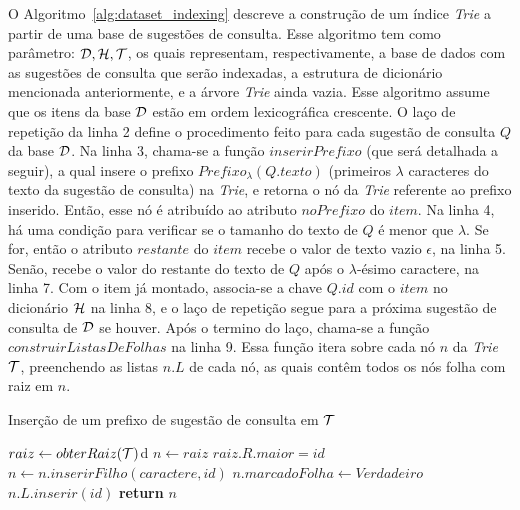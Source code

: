 O Algoritmo~\ref{alg:dataset_indexing} descreve a construção de um índice \textit{Trie} a partir de uma base de sugestões de consulta. Esse algoritmo tem como parâmetro: $\mathcal{D}, \mathcal{H}, \mathcal{T}$, os quais representam, respectivamente, a base de dados com as sugestões de consulta que serão indexadas, a estrutura de dicionário mencionada anteriormente, e a árvore \textit{Trie} ainda vazia. Esse algoritmo assume que os itens da base $\mathcal{D}$ estão em ordem lexicográfica crescente. O laço de repetição da linha 2 define o procedimento feito para cada sugestão de consulta $Q$ da base $\mathcal{D}$. Na linha 3, chama-se a função $inserirPrefixo$ (que será detalhada a seguir), a qual insere o prefixo $Prefixo_{\lambda}(Q.texto)$ (primeiros $\lambda$ caracteres do texto da sugestão de consulta) na \textit{Trie}, e retorna o nó da \textit{Trie} referente ao prefixo inserido. Então, esse nó é atribuído ao atributo $noPrefixo$ do $item$. Na linha 4, há uma condição para verificar se o tamanho do texto de $Q$ é menor que $\lambda$. Se for, então o atributo $restante$ do $item$ recebe o valor de texto vazio $\epsilon$, na linha 5. Senão, recebe o valor do restante do texto de $Q$ após o $\lambda$-ésimo caractere, na linha 7. Com o item já montado, associa-se a chave $Q.id$ com o $item$ no dicionário $\mathcal{H}$ na linha 8, e o laço de repetição segue para a próxima sugestão de consulta de $\mathcal{D}$ se houver. Após o termino do laço, chama-se a função $construirListasDeFolhas$ na linha 9. Essa função itera sobre cada nó $n$ da \textit{Trie}  $\mathcal{T}$, preenchendo as listas $n.L$ de cada nó, as quais contêm todos os nós folha com raiz em $n$.


\begin{algorithm}[H]
\caption{Inserção de um prefixo de sugestão de consulta em $\mathcal{T}$}\label{alg:append_prefix_trie}
\begin{algorithmic}[1]
    \State $raiz \leftarrow obterRaiz(\mathcal{T})$d
    \State $n \leftarrow raiz$
    \State $raiz.R.maior = id$
        \State $n \leftarrow n.inserirFilho(caractere, id)$
    \EndFor
    \State $n.marcadoFolha \leftarrow Verdadeiro$
    \State $n.L.inserir(id)$
    \State \textbf{return} $n$
\EndFunction
\end{algorithmic}
\end{algorithm}

